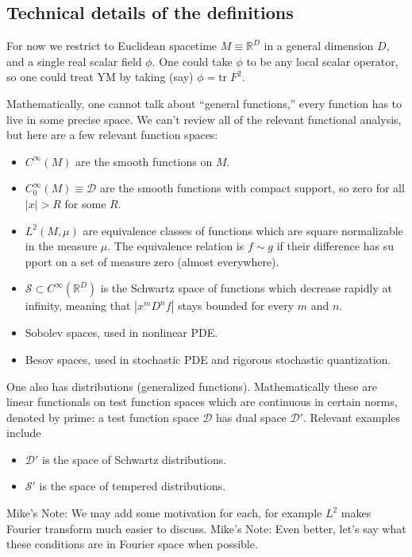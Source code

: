 \documentclass{article}
\newcommand{\1}{\mathbbm{1}}
\theoremstyle{plain}
\theoremstyle{definition}
\numberwithin{equation}{section}
\def\IR{\mathbb{R}}
\def\tr{\mbox{tr}\;}
\newcommand{\cD}{\mathcal D}
\newcommand{\cS}{\mathcal S}
\newcommand\MRD[1]{{\color{red} Mike's Note: #1}}
\begin{document}
\subsection{Technical details of the definitions}

For now we restrict to Euclidean spacetime $M \equiv \IR^D$ in a general dimension $D$, and a single real scalar field $\phi$.
One could take $\phi$ to be any local scalar operator, so one could treat YM by taking (say) $\phi=\tr F^2$.

Mathematically, one cannot talk about ``general functions,'' every function has to live in some precise space.  
We can't review all of the relevant functional analysis, but here are a few relevant function spaces:
\begin{itemize}
    \item $C^\infty(M)$ are the smooth functions on $M$. 
    \item $C_0^\infty(M) \equiv \cD$ are the smooth functions with compact support, so zero for all $|x|>R$ for some $R$.
    \item $L^2(M,\mu)$ are equivalence classes of functions which are square normalizable in the measure $\mu$.   The equivalence relation
    is $f \sim g$ if their difference has su pport on a set of measure zero (almost everywhere).
    \item $\cS \subset C^\infty(\IR^D)$ is the Schwartz space of functions which decrease rapidly at infinity, meaning that
    $|x^m D^n f|$ stays bounded for every $m$ and $n$.
    \item Sobolev spaces, used in nonlinear PDE.
    \item Besov spaces, used in stochastic PDE and rigorous stochastic quantization.
\end{itemize}
One also has distributions (generalized functions).  Mathematically these are linear functionals
on test function spaces which are continuous in certain norms, denoted by prime: 
a test function space $\cD$ has dual space $\cD'$.  
Relevant examples include 
\begin{itemize}
    \item $\cD'$ is the space of Schwartz distributions.
    \item $\cS'$ is the space of tempered distributions.
\end{itemize}
\MRD{We may add some motivation for each, for example $L^2$ makes Fourier transform much easier to discuss.}
\MRD{Even better, let's say what these conditions are in Fourier space when possible.}
\end{document}
